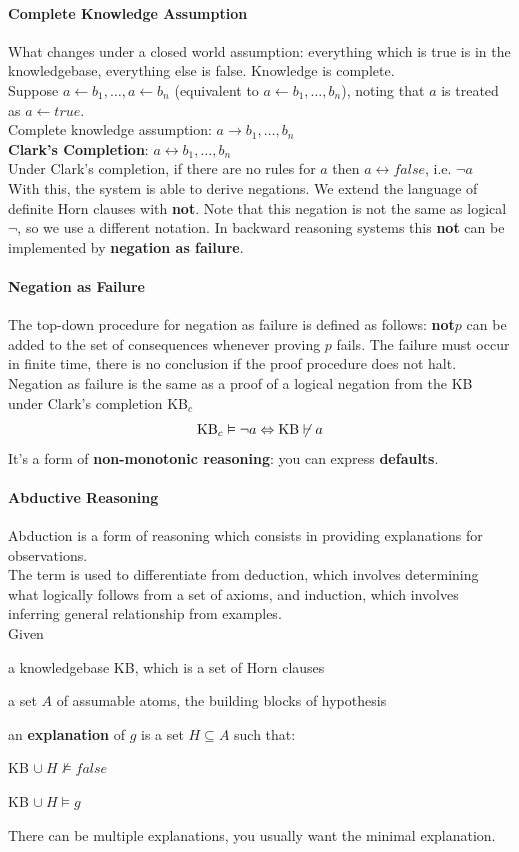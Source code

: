 \documentclass[10pt]{report}
\begin{document}
\paragraph{Complete Knowledge Assumption} What changes under a closed world assumption: everything which is true is in the knowledgebase, everything else is false. Knowledge is complete.\\
Suppose $a\leftarrow b_1,\ldots,a\leftarrow b_n$ (equivalent to $a\leftarrow b_1,\ldots,b_n$), noting that $a$ is treated as $a\leftarrow true$.\\
Complete knowledge assumption: $a\rightarrow b_1,\ldots,b_n$\\
\textbf{Clark's Completion}: $a\leftrightarrow b_1,\ldots,b_n$\\
Under Clark's completion, if there are no rules for $a$ then $a\leftrightarrow false$, i.e. $\neg a$\\
With this, the system is able to derive negations. We extend the language of definite Horn clauses with \textbf{not}. Note that this negation is not the same as logical $\neg$, so we use a different notation. In backward reasoning systems this \textbf{not} can be implemented by \textbf{negation as failure}.
\paragraph{Negation as Failure} The top-down procedure for negation as failure is defined as follows: \textbf{not}$p$ can be added to the set of consequences whenever proving $p$ fails. The failure must occur in finite time, there is no conclusion if the proof procedure does not halt.\\
Negation as failure is the same as a proof of a logical negation from the KB under Clark's completion KB$_c$ $$\hbox{KB}_c\vDash\neg a\Leftrightarrow\hbox{KB}\not\vdash a$$
It's a form of \textbf{non-monotonic reasoning}: you can express \textbf{defaults}.
\paragraph{Abductive Reasoning} Abduction is a form of reasoning which consists in providing explanations for observations.\\
The term is used to differentiate from deduction, which involves determining what logically follows from a set of axioms, and induction, which involves inferring general relationship from examples.\\
Given\begin{list}{}{}
	\item a knowledgebase KB, which is a set of Horn clauses
	\item a set $A$ of assumable atoms, the building blocks of hypothesis
\end{list}
an \textbf{explanation} of $g$ is a set $H\subseteq A$ such that:
\begin{list}{}{}
	\item KB $\cup\:H\not\vDash false$
	\item KB $\cup\:H\vDash g$
\end{list}
There can be multiple explanations, you usually want the minimal explanation.
\end{document}
